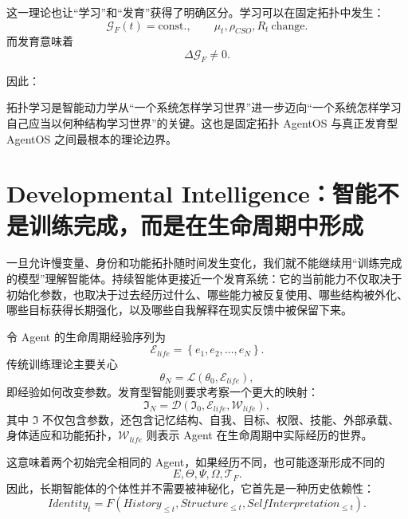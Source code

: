 这一理论也让“学习”和“发育”获得了明确区分。学习可以在固定拓扑中发生：
\begin{equation}
\mathcal{G}_{F}(t)=\mathrm{const.},
\qquad
\mu_t,\rho_{CSO},R_t\ \text{change}.
\end{equation}
而发育意味着
\begin{equation}
\boxed{
\Delta\mathcal{G}_{F}\neq0.
}
\end{equation}

因此：
\begin{statementbox}
\centering
{}
\end{statementbox}

拓扑学习是智能动力学从“一个系统怎样学习世界”进一步迈向“一个系统怎样学习自己应当以何种结构学习世界”的关键。这也是固定拓扑 AgentOS 与真正发育型 AgentOS 之间最根本的理论边界。

\section{Developmental Intelligence：智能不是训练完成，而是在生命周期中形成}

一旦允许慢变量、身份和功能拓扑随时间发生变化，我们就不能继续用“训练完成的模型”理解智能体。持续智能体更接近一个发育系统：它的当前能力不仅取决于初始化参数，也取决于过去经历过什么、哪些能力被反复使用、哪些结构被外化、哪些目标获得长期强化，以及哪些自我解释在现实反馈中被保留下来。

令 Agent 的生命周期经验序列为
\begin{equation}
\mathcal{E}_{life}
=
\left\{
e_1,e_2,\ldots,e_N
\right\}.
\end{equation}
传统训练理论主要关心
\begin{equation}
\theta_{N}
=
\mathcal{L}
\left(
\theta_0,\mathcal{E}_{life}
\right),
\end{equation}
即经验如何改变参数。发育型智能则要求考察一个更大的映射：
\begin{equation}
\boxed{
\mathfrak{I}_{N}
=
\mathcal{D}
\left(
\mathfrak{I}_0,
\mathcal{E}_{life},
\mathcal{W}_{life}
\right),
}
\end{equation}
其中 $\mathfrak{I}$ 不仅包含参数，还包含记忆结构、自我、目标、权限、技能、外部承载、身体适应和功能拓扑，$\mathcal{W}_{life}$ 则表示 Agent 在生命周期中实际经历的世界。

这意味着两个初始完全相同的 Agent，如果经历不同，也可能逐渐形成不同的
\begin{equation}
E,\Theta,\Psi,\Omega,\mathcal{T}_{F}.
\end{equation}
因此，长期智能体的个体性并不需要被神秘化，它首先是一种历史依赖性：
\begin{equation}
\boxed{
Identity_{t}
=
F
\left(
History_{\leq t},
Structure_{\leq t},
SelfInterpretation_{\leq t}
\right).
}
\end{equation}

